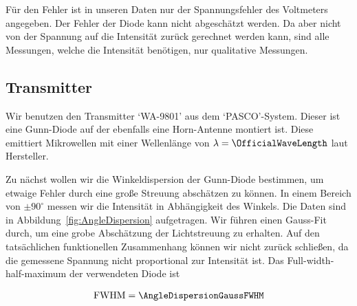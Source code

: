 \documentclass[a4paper,10pt,twocolumn]{article}
\begin{document}
    Für den Fehler ist in unseren Daten nur der Spannungsfehler des Voltmeters angegeben.
    Der Fehler der Diode kann nicht abgeschätzt werden.
    Da aber nicht von der Spannung auf die Intensität zurück gerechnet werden kann, sind alle 
    Messungen, welche die Intensität benötigen, nur qualitative Messungen.
    
    \subsection{Transmitter}

    


    Wir benutzen den Transmitter `WA-9801' aus dem `PASCO'-System.
    Dieser ist eine Gunn-Diode auf der ebenfalls eine Horn-Antenne montiert ist.
    Diese emittiert Mikrowellen mit einer Wellenlänge von $\lambda = \OfficialWaveLength$ laut Hersteller.
    
    Zu nächst wollen wir die Winkeldispersion der Gunn-Diode bestimmen, um etwaige Fehler durch eine
    große Streuung abschätzen zu können.
    In einem Bereich von $\pm 90 ^{\circ}$ messen wir die Intensität in Abhängigkeit des Winkels.
    Die Daten sind in Abbildung~\ref{fig:AngleDispersion} aufgetragen.
    Wir führen einen Gauss-Fit durch, um eine grobe Abschätzung der Lichtstreuung zu erhalten.
    Auf den tatsächlichen funktionellen Zusammenhang können wir nicht zurück schließen, da die gemessene Spannung
    nicht proportional zur Intensität ist.
    Das Full-width-half-maximum der verwendeten Diode ist
    
    \begin{align*}
        \mathrm{FWHM} = \AngleDispersionGaussFWHM
    \end{align*}
    
\end{document}
